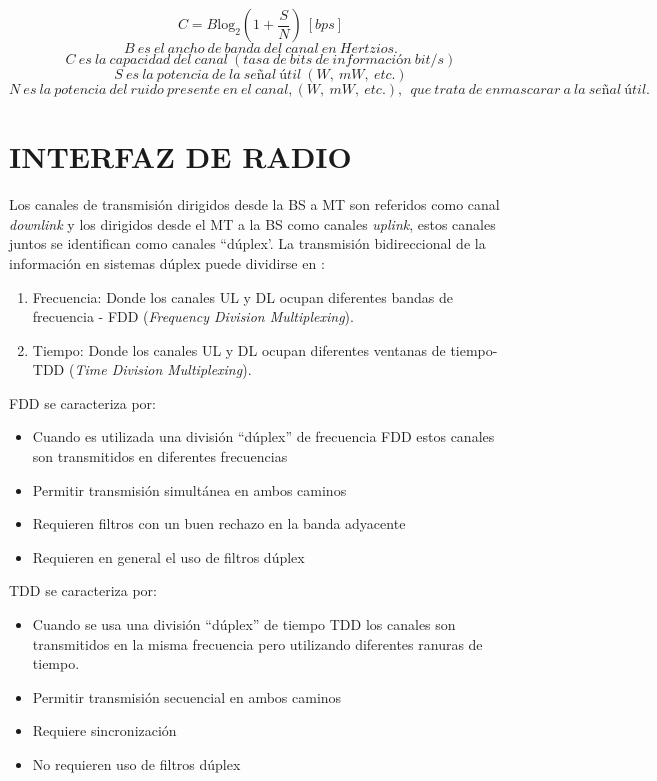 \begin{equation}
C=B{{\mathrm{log}}_2 \left(1+\frac{S}{N}\right)\   [bps] }
\label{eqn:Shannon}
\end{equation}
\[B\ es\ el\ ancho\ de\ banda\ del\ canal\ en\ Hertzios.\]
\[C\ es\ la\ capacidad\ del\ canal\ (tasa\ de\ bits\ de\ informaci\textrm{ó}n\ bit/s)\]
\[S\ es\ la\ potencia\ de\ la\ se\textrm{\~{n}}al\ \textrm{ú}til\ (W,\ mW,\ etc.)\]
\[N\ es\ la\ potencia\ del\ ruido\ presente\ en\ el\ canal,\left(W,\ mW,\ etc.\right),\ \ que\ trata\ de\ enmascarar\ a\ la\ se\textrm{\~{n}}al\ \textrm{ú}til.\] 



\section{INTERFAZ DE RADIO}

Los canales de transmisión dirigidos desde la BS a MT son referidos como canal \textit{downlink} y los dirigidos desde el MT a la BS como canales \textit{uplink}, estos canales juntos se identifican como canales ``dúplex'. La transmisión bidireccional de la información en sistemas dúplex puede dividirse en \parencite{Correia2018}:

\begin{enumerate}
\item  Frecuencia: Donde los canales UL y DL ocupan diferentes bandas de frecuencia - FDD (\textit{Frequency Division Multiplexing}).
\item  Tiempo: Donde los canales UL y DL ocupan diferentes ventanas de tiempo- TDD (\textit{Time Division Multiplexing}).
\end{enumerate}

FDD se caracteriza por: 
\begin{itemize}
\item  Cuando es utilizada una división ``dúplex'' de frecuencia FDD estos canales son transmitidos en diferentes frecuencias
\item  Permitir transmisión simultánea en ambos caminos
\item  Requieren filtros con un buen rechazo en la banda adyacente
\item  Requieren en general el uso de filtros dúplex
\end{itemize}

TDD se caracteriza por: 
\begin{itemize}
\item  Cuando se usa una división ``dúplex'' de tiempo TDD los canales son transmitidos en la misma frecuencia pero utilizando diferentes ranuras de tiempo.
\item  Permitir transmisión secuencial en ambos caminos
\item  Requiere sincronización
\item  No requieren uso de filtros dúplex
\end{itemize}

